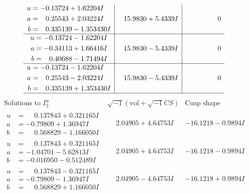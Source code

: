 \documentclass[1p]{elsarticle_modified}
\theoremstyle{definition}
\newcommand{\I}{\sqrt{-1}}
\begin{document}
$$\begin{array}{c|c|c}
\begin{aligned}
u &= -0.13724 + 1.62204 I \\
a &= \phantom{-}0.25543 + 2.03224 I \\
b &= \phantom{-}0.335139 - 1.353430 I\end{aligned}
 & \phantom{-}15.9830 + 5.4339 I & \phantom{-0.000000 } 0 \\ \hline\begin{aligned}
u &= -0.13724 - 1.62204 I \\
a &= -0.34113 + 1.66416 I \\
b &= \phantom{-}0.40688 - 1.71494 I\end{aligned}
 & \phantom{-}15.9830 - 5.4339 I & \phantom{-0.000000 } 0 \\ \hline\begin{aligned}
u &= -0.13724 - 1.62204 I \\
a &= \phantom{-}0.25543 - 2.03224 I \\
b &= \phantom{-}0.335139 + 1.353430 I\end{aligned}
 & \phantom{-}15.9830 - 5.4339 I & \phantom{-0.000000 } 0\\
 \hline 
 \end{array}$$\newpage$$\begin{array}{c|c|c}  
\text{Solutions to }I^u_{2}& \I (\text{vol} + \sqrt{-1}CS) & \text{Cusp shape}\\
 \hline 
\begin{aligned}
u &= \phantom{-}0.137843 + 0.321165 I \\
a &= -0.79809 + 1.36947 I \\
b &= \phantom{-}0.568829 - 1.166050 I\end{aligned}
 & \phantom{-}2.04905 + 4.64753 I & -16.1218 - 0.9894 I \\ \hline\begin{aligned}
u &= \phantom{-}0.137843 + 0.321165 I \\
a &= -1.04701 - 5.62813 I \\
b &= -0.016950 - 0.512489 I\end{aligned}
 & \phantom{-}2.04905 + 4.64753 I & -16.1218 - 0.9894 I \\ \hline\begin{aligned}
u &= \phantom{-}0.137843 - 0.321165 I \\
a &= -0.79809 - 1.36947 I \\
b &= \phantom{-}0.568829 + 1.166050 I\end{aligned}
 & \phantom{-}2.04905 - 4.64753 I & -16.1218 + 0.9894 I \\ \hline\begin{aligned}

\end{aligned}
\end{array}$$
\end{document}
